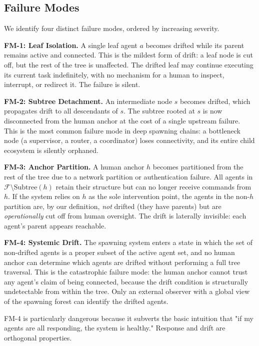 \subsection{Failure Modes}

We identify four distinct failure modes, ordered by increasing severity.

\textbf{FM-1: Leaf Isolation.}
A single leaf agent $a$ becomes drifted while its parent remains active and connected. This is the mildest form of drift: a leaf node is cut off, but the rest of the tree is unaffected. The drifted leaf may continue executing its current task indefinitely, with no mechanism for a human to inspect, interrupt, or redirect it. The failure is silent.

\textbf{FM-2: Subtree Detachment.}
An intermediate node $s$ becomes drifted, which propagates drift to all descendants of $s$. The subtree rooted at $s$ is now disconnected from the human anchor at the cost of a single upstream failure. This is the most common failure mode in deep spawning chains: a bottleneck node (a supervisor, a router, a coordinator) loses connectivity, and its entire child ecosystem is silently orphaned.

\textbf{FM-3: Anchor Partition.}
A human anchor $h$ becomes partitioned from the rest of the tree due to a network partition or authentication failure. All agents in $\mathcal{F} \setminus \text{Subtree}(h)$ retain their structure but can no longer receive commands from $h$. If the system relies on $h$ as the sole intervention point, the agents in the non-$h$ partition are, by our definition, \emph{not} drifted (they have parents) but are \emph{operationally} cut off from human oversight. The drift is laterally invisible: each agent's parent appears reachable.

\textbf{FM-4: Systemic Drift.}
The spawning system enters a state in which the set of non-drifted agents is a proper subset of the active agent set, and no human anchor can determine which agents are drifted without performing a full tree traversal. This is the catastrophic failure mode: the human anchor cannot trust any agent's claim of being connected, because the drift condition is structurally undetectable from within the tree. Only an external observer with a global view of the spawning forest can identify the drifted agents.

FM-4 is particularly dangerous because it subverts the basic intuition that "if my agents are all responding, the system is healthy." Response and drift are orthogonal properties.

